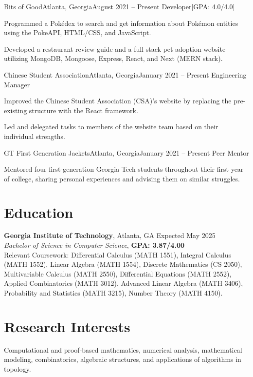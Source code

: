 \begin{resume-itemize}
  {Bits of Good}{Atlanta, Georgia}{August 2021 -- Present}
  {Developer}[GPA: 4.0/4.0]
    \item Programmed a Pokédex to search and get information about Pokémon entities using the PokeAPI, HTML/CSS, and JavaScript.
    \item Developed a restaurant review guide and a full-stack pet adoption website utilizing MongoDB, Mongoose, Express, React, and Next (MERN stack).
\end{resume-itemize}
\begin{resume-itemize}
  {Chinese Student Association}{Atlanta, Georgia}{January 2021 -- Present}
  {Engineering Manager}
  \item Improved the Chinese Student Association (CSA)'s website by replacing the pre-existing structure with the React framework.
  \item Led and delegated tasks to members of the website team based on their individual strengths.
\end{resume-itemize}
\begin{resume-itemize}
  {GT First Generation Jackets}{Atlanta, Georgia}{January 2021 -- Present}
  {Peer Mentor}
  \item Mentored four first-generation Georgia Tech students throughout their first year of college, sharing personal experiences and advising them on similar struggles.
\end{resume-itemize}






\section*{Education}
\noindent
\textbf{Georgia Institute of Technology}, Atlanta, GA \hfill Expected May 2025\\
\textit{Bachelor of Science in Computer Science}, \textbf{GPA: 3.87/4.00}\\
Relevant Coursework: Differential Calculus (MATH 1551), Integral Calculus (MATH 1552), Linear Algebra (MATH 1554), Discrete Mathematics (CS 2050), Multivariable Calculus (MATH 2550), Differential Equations (MATH 2552), Applied Combinatorics (MATH 3012), Advanced Linear Algebra (MATH 3406), Probability and Statistics (MATH 3215), Number Theory (MATH 4150).

\section*{Research Interests}
Computational and proof-based mathematics, numerical analysis, mathematical modeling, combinatorics, algebraic structures, and applications of algorithms in topology.

